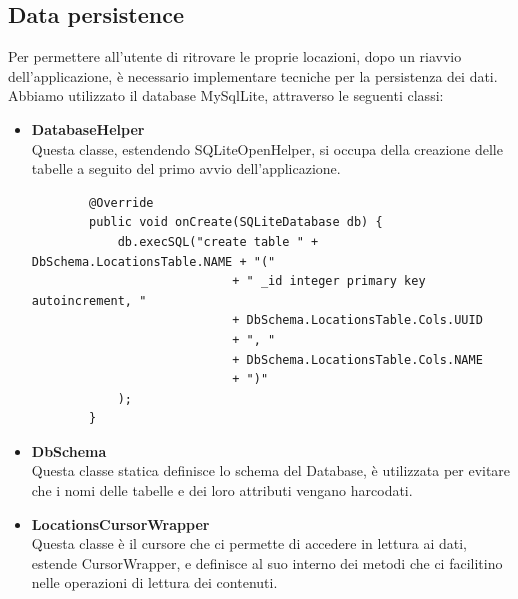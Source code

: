 \documentclass{article}
\begin{document}
\subsection{Data persistence}
Per permettere all'utente di ritrovare le proprie locazioni, dopo un riavvio dell'applicazione, è necessario implementare tecniche per la persistenza dei dati.
Abbiamo utilizzato il database MySqlLite, attraverso le seguenti classi:
\begin{itemize}
    \item \textbf{DatabaseHelper}\\ Questa classe, estendendo SQLiteOpenHelper, si occupa della creazione delle tabelle a seguito del primo avvio dell'applicazione.
    \begin{lstlisting}
        @Override
        public void onCreate(SQLiteDatabase db) {
            db.execSQL("create table " + DbSchema.LocationsTable.NAME + "("
                            + " _id integer primary key autoincrement, "
                            + DbSchema.LocationsTable.Cols.UUID
                            + ", "
                            + DbSchema.LocationsTable.Cols.NAME
                            + ")"
            );
        }
    \end{lstlisting}
    \item \textbf{DbSchema}\\ Questa classe statica definisce lo schema del Database, è utilizzata per evitare che i nomi delle tabelle e dei
    loro attributi vengano harcodati.
    \item \textbf{LocationsCursorWrapper}\\ Questa classe è il cursore che ci permette di accedere in lettura ai dati, estende CursorWrapper, e definisce
    al suo interno dei metodi che ci facilitino nelle operazioni di lettura dei contenuti.
\end{itemize}
\end{document}
